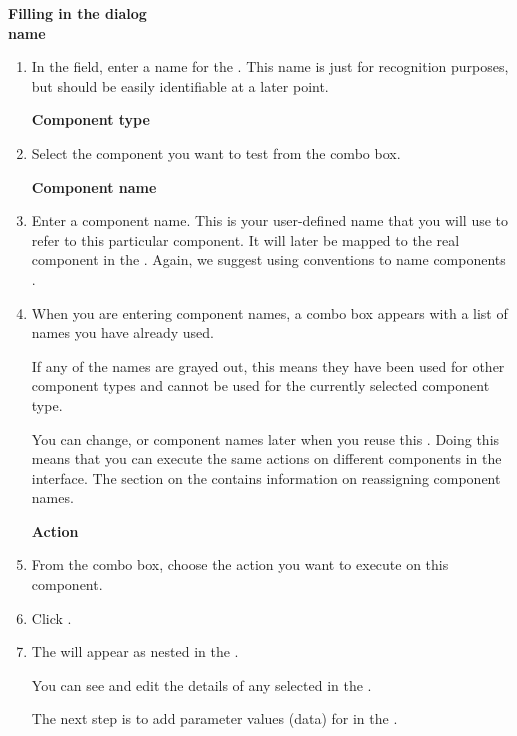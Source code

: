 \textbf{Filling in the \gdstep{} dialog}\\
\textbf{\gdstep{} name}
\begin{enumerate}
\item In the  field, enter a name for the \gdstep{}. This name is just for recognition 
purposes, but should be easily identifiable at a later point. 

\textbf{Component type}
\item Select the component you want to test from the combo box. 


\textbf{Component name}
\label{componentnameteststep}
\item Enter a component name. This is your user-defined name that you will use to refer to this particular component. It will later be mapped to the real component in the \gdaut{}. Again, we suggest using conventions to name components . 

\item When you are entering component names, a combo box appears with a list of names you have already used. 

If any of the names are grayed out, this means they have been used for other component types and cannot be used for the currently selected component type. 

You can change, or  component names later when you reuse this \gdcase{}. Doing this means that you can execute the same actions on different components in the interface. The section on the \gdcompnamesview{}  contains information on reassigning component names. 

\textbf{Action}

\item From the combo box, choose the action you want to execute on this component. 

\item Click . 
\item The \gdstep{} will appear as nested in the \gdcase{}.  

You can see and edit the details of any selected \gdstep{} in the \gdpropview{}.

The next step is to add parameter values (data) for \gdsteps{} in the \gdpropview{} . 
\end{enumerate}

